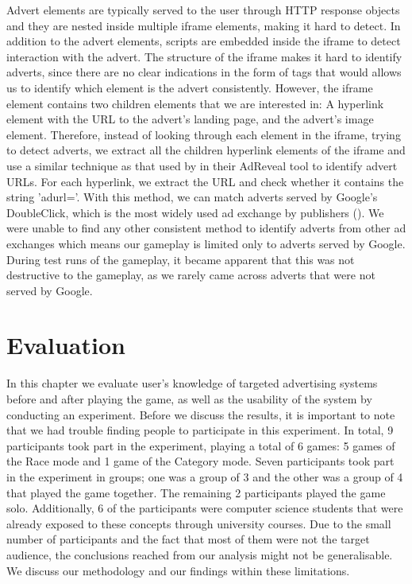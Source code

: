 \documentclass{l4proj}
\begin{document}
Advert elements are typically served to the user through HTTP response objects and they are nested inside multiple iframe elements, making it hard to detect. In addition to the advert elements, scripts are embedded inside the iframe to detect interaction with the advert. The structure of the iframe makes it hard to identify adverts, since there are no clear indications in the form of tags that would allows us to identify which element is the advert consistently. However, the iframe element contains two children elements that we are interested in: A hyperlink element with the URL to the advert's landing page, and the advert's image element. Therefore, instead of looking through each element in the iframe, trying to detect adverts, we extract all the children hyperlink elements of the iframe and use a similar technique as that used by \cite{Liu2013} in their AdReveal tool to identify advert URLs. For each hyperlink, we extract the URL and check whether it contains the string 'adurl='. With this method, we can match adverts served by Google's DoubleClick, which is the most widely used ad exchange by publishers (\cite{dclick}). We were unable to find any other consistent method to identify adverts from other ad exchanges which means our gameplay is limited only to adverts served by Google. During test runs of the gameplay, it became apparent that this was not destructive to the gameplay, as we rarely came across adverts that were not served by Google.

\chapter{Evaluation} 
In this chapter we evaluate user's knowledge of targeted advertising systems before and after playing the game, as well as the usability of the system by conducting an experiment. 
Before we discuss the results, it is important to note that we had trouble finding people to participate in this experiment. In total, 9 participants took part in the experiment, playing a total of 6 games: 5 games of the Race mode and 1 game of the Category mode. Seven participants took part in the experiment in groups; one was a group of 3 and the other was a group of 4 that played the game together. The remaining 2 participants played the game solo. Additionally, 6 of the participants were computer science students that were already exposed to these concepts through university courses. Due to the small number of participants and the fact that most of them were not the target audience, the conclusions reached from our analysis might not be generalisable. We discuss our methodology and our findings within these limitations.
\end{document}
